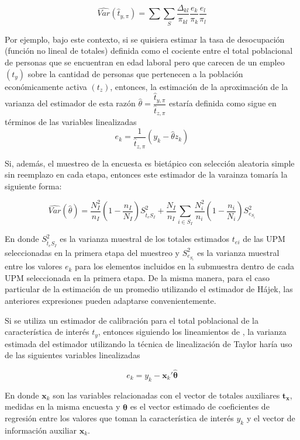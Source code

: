 \documentclass[
  12pt,
  spanish,
]{book}
\begin{document}
\[
    \widehat{Var}(\hat{t}_{y,\pi})=\sum\sum_S \dfrac{\Delta_{kl}}{\pi_{kl}}\frac{e_k}{\pi_k}\frac{e_l}{\pi_l}
\]

Por ejemplo, bajo este contexto, si se quisiera estimar la tasa de desocupación (función no lineal de totales) definida como el cociente entre el total poblacional de personas que se encuentran en edad laboral pero que carecen de un empleo \(({t}_{y})\) sobre la cantidad de personas que pertenecen a la población económicamente activa \(({t}_{z})\), entonces, la estimación de la aproximación de la varianza del estimador de esta razón \(\hat{\theta}=\dfrac{\hat{t}_{y,\pi}}{\hat{t}_{z,\pi}}\) estaría definida como sigue en términos de las variables linealizadas
\[
e_k=\dfrac{1}{\hat{t}_{z,\pi}}(y_k-\hat{\theta}z_k)
\]

Si, además, el muestreo de la encuesta es bietápico con selección aleatoria simple sin reemplazo en cada etapa, entonces este estimador de la varainza tomaría la siguiente forma:

\[
\widehat{Var}(\hat{\theta})=\frac{N_{I}^2}{n_{I}}\left(1-\frac{n_{I}}{N_{I}}\right)S^2_{\hat{t}_{e}S_I}+
\frac{N_{I}}{n_{I}}\sum_{i\in S_{I}}\frac{N_i^2}{n_i}\left(1-\frac{n_i}{N_i}\right)S^2_{e_{S_i}}
\]

En donde \(S^2_{\hat{t}_{e}S_I}\) es la varianza muestral de los totales estimados \(t_{ei}\) de las UPM seleccionadas en la primera etapa del muestreo y \(S^2_{e_{S_i}}\) es la varianza muestral entre los valores \(e_k\) para los elementos incluidos en la submuestra dentro de cada UPM seleccionada en la primera etapa. De la misma manera, para el caso particular de la estimación de un promedio utilizando el estimador de Hájek, las anteriores expresiones pueden adaptarse convenientemente.

Si se utiliza un estimador de calibración para el total poblacional de la característica de interés \(t_y\), entonces siguiendo los lineamientos de \citet[sección 10.6]{Gutierrez_2016}, la varianza estimada del estimador utilizando la técnica de linealización de Taylor haría uso de las siguientes variables linealizadas

\[
e_k=y_k-\mathbf{x}_k'\mathbf{\hat{\theta}}
\]

En donde \(\mathbf{x}_k\) son las variables relacionadas con el vector de totales auxiliares \(\mathbf{t}_{\mathbf{x}}\), medidas en la misma encuesta y \(\mathbf{\hat{\theta}}\) es el vector estimado de coeficientes de regresión entre los valores que toman la característica de interés \(y_k\) y el vector de información auxiliar \(\mathbf{x}_k\).
\end{document}
